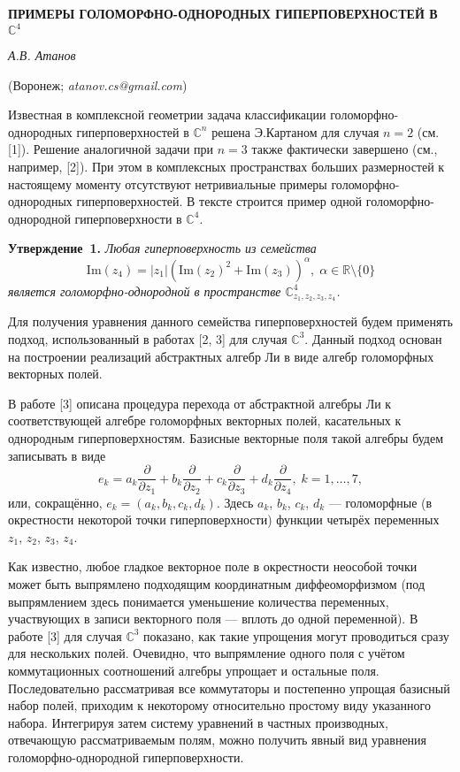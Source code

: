 \begin{center}
    {\bf ПРИМЕРЫ ГОЛОМОРФНО-ОДНОРОДНЫХ ГИПЕРПОВЕРХНОСТЕЙ В $\mathbb{C}^4$}

    {\it А.В. Атанов}

    (Воронеж; {\it atanov.cs@gmail.com})
\end{center}


Известная в комплексной геометрии задача классификации голоморфно-однородных гиперповерхностей в $\mathbb{C}^n$ решена Э.Картаном для случая $n = 2$ (см. [1]). Решение аналогичной задачи при $n = 3$ также фактически завершено (см., например, [2]). При этом в комплексных пространствах больших размерностей к настоящему моменту отсутствуют нетривиальные примеры голоморфно-однородных гиперповерхностей. В тексте строится пример одной голоморфно-однородной гиперповерхности в $\mathbb{C}^4$.

\textbf{Утверждение~1.} {\it Любая гиперповерхность из семейства
$$\mathrm{Im}(z_4) = |z_1| \left(\mathrm{Im}(z_2)^2 + \mathrm{Im}(z_3)\right)^\alpha , \; \alpha \in \mathbb{R}\setminus\{0\}$$
является голоморфно-однородной в пространстве $\mathbb{C}^4_{z_1, z_2, z_3, z_4}$.}

Для получения уравнения данного семейства гиперповерхностей будем применять подход, использованный в работах [2, 3] для случая $\mathbb{C}^3$. Данный подход основан на построении реализаций абстрактных алгебр Ли в виде алгебр голоморфных векторных полей.

В работе [3] описана процедура перехода от абстрактной алгебры Ли к соответствующей алгебре голоморфных векторных полей, касательных к однородным гиперповерхностям. Базисные векторные поля такой алгебры будем записывать в виде
$$
e_k = a_k\frac{\partial}{\partial z_1} + b_k\frac{\partial}{\partial z_2} + c_k\frac{\partial}{\partial z_3} + d_k\frac{\partial}{\partial z_4}, \; k = 1, \ldots, 7,
$$
или, сокращённо, $e_k = \left( a_k, b_k, c_k, d_k\right)$. Здесь $a_k$, $b_k$, $c_k$, $d_k$ --- голоморфные (в окрестности некоторой точки гиперповерхности) функции четырёх переменных $z_1$, $z_2$, $z_3$, $z_4$.

Как известно, любое гладкое векторное поле в окрестности неособой точки может быть выпрямлено подходящим координатным диффеоморфизмом (под выпрямлением здесь понимается уменьшение количества переменных, участвующих в записи векторного поля --- вплоть до одной переменной). В работе [3] для случая $\mathbb{C}^3$ показано, как такие упрощения могут проводиться сразу для нескольких полей. Очевидно, что выпрямление одного поля с учётом коммутационных соотношений алгебры упрощает и остальные поля. Последовательно рассматривая все коммутаторы и постепенно упрощая базисный набор полей, приходим к некоторому относительно простому виду указанного набора. Интегрируя затем систему уравнений в частных производных, отвечающую рассматриваемым полям, можно получить явный вид уравнения голоморфно-однородной гиперповерхности.

